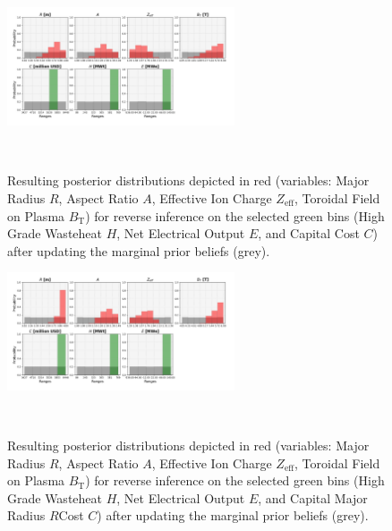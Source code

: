 \begin{figure}[!b]
    \centering
    \includegraphics[width=0.6\textwidth]{figures/TE_results/march_data/config(57)_3outputs_V2_8.png}
    \caption{Resulting posterior distributions depicted in red (variables: Major Radius $R$, Aspect Ratio $A$, Effective Ion Charge $Z_{\text{eff}}$, Toroidal Field on Plasma $B_{\text{T}}$) for reverse inference on the selected green bins (High Grade Wasteheat $H$, Net Electrical Output $E$, and  Capital Cost $C$) after updating the marginal prior beliefs (grey).}~\label{fig:config(57)_3outputs_V2_8}
\end{figure}

\begin{figure}[!b]
    \centering
    \includegraphics[width=0.6\textwidth]{figures/TE_results/march_data/config(57)_3outputs_V2_9.png}
    \caption{Resulting posterior distributions depicted in red (variables: Major Radius $R$, Aspect Ratio $A$, Effective Ion Charge $Z_{\text{eff}}$, Toroidal Field on Plasma $B_{\text{T}}$) for reverse inference on the selected green bins (High Grade Wasteheat $H$, Net Electrical Output $E$, and  Capital Major Radius $R$Cost $C$) after updating the marginal prior beliefs (grey).}~\label{fig:config(57)_3outputs_V2_9}
\end{figure}


